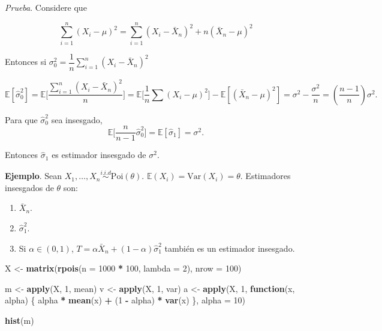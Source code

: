 \documentclass[
  12pt,
]{book}
\newenvironment{Shaded}{\begin{snugshade}}{\end{snugshade}}
\newcommand{\ControlFlowTok}[1]{\textcolor[rgb]{0.13,0.29,0.53}{\textbf{#1}}}
\newcommand{\DataTypeTok}[1]{\textcolor[rgb]{0.13,0.29,0.53}{#1}}
\newcommand{\DecValTok}[1]{\textcolor[rgb]{0.00,0.00,0.81}{#1}}
\newcommand{\KeywordTok}[1]{\textcolor[rgb]{0.13,0.29,0.53}{\textbf{#1}}}
\newcommand{\NormalTok}[1]{#1}
\newcommand{\OperatorTok}[1]{\textcolor[rgb]{0.81,0.36,0.00}{\textbf{#1}}}
\newcommand{\StringTok}[1]{\textcolor[rgb]{0.31,0.60,0.02}{#1}}
\begin{document}
\emph{Prueba}. Considere que

\begin{equation}
\sum_{i=1}^{n}\left(X_{i}-\mu\right)^{2}=\sum_{i=1}^{n}\left(X_{i}-\bar{X}_{n}\right)^{2}+n\left(\bar{X}_{n}-\mu\right)^{2}
\end{equation}

Entonces si \(\sigma_0 ^{2} = \dfrac 1n \sum_{i=1}^{n}\left(X_{i}-\bar{X}_{n}\right)^{2}\)

\[\mathbb E[\hat\sigma_0^2] = \mathbb E \bigg[ \dfrac {\sum_{i=1}^{n}\left(X_{i}-\bar{X}_{n}\right)^{2}}n \bigg] =  \mathbb E \bigg[ \dfrac 1n \sum(X_i-\mu)^2\bigg] - \mathbb E[(\bar X_n-\mu)^2] = \sigma^2-\dfrac{\sigma^2}n = \left(\dfrac{n-1}n\right)\sigma^2.\]

Para que \(\hat\sigma_0^2\) sea insesgado,
\[\mathbb E \bigg[\dfrac n{n-1}\hat\sigma_0^2\bigg] = \mathbb E[\hat\sigma_1] = \sigma^2.\]

Entonces \(\hat\sigma_1\) es estimador insesgado de \(\sigma^2\).

\textbf{Ejemplo}. Sean \(X_1,\dots,X_n \overset{i.i.d}{\sim}\text{Poi}(\theta)\).
\(\mathbb E(X_i) = \text{Var}(X_i) = \theta\). Estimadores insesgados de \(\theta\)
son:

\begin{enumerate}
\def\labelenumi{\arabic{enumi}.}
\item
  \(\bar X_n\).
\item
  \(\hat \sigma_1^2\).
\item
  Si \(\alpha \in (0,1)\), \(T = \alpha\bar X_n + (1-\alpha)\hat\sigma_1^2\)
  también es un estimador insesgado.
\end{enumerate}

\begin{Shaded}
\begin{Highlighting}[]
\NormalTok{X \textless{}{-}}\StringTok{ }\KeywordTok{matrix}\NormalTok{(}\KeywordTok{rpois}\NormalTok{(}\DataTypeTok{n =} \DecValTok{1000} \OperatorTok{*}\StringTok{ }\DecValTok{100}\NormalTok{, }\DataTypeTok{lambda =} \DecValTok{2}\NormalTok{), }\DataTypeTok{nrow =} \DecValTok{100}\NormalTok{)}

\NormalTok{m \textless{}{-}}\StringTok{ }\KeywordTok{apply}\NormalTok{(X, }\DecValTok{1}\NormalTok{, mean)}
\NormalTok{v \textless{}{-}}\StringTok{ }\KeywordTok{apply}\NormalTok{(X, }\DecValTok{1}\NormalTok{, var)}
\NormalTok{a \textless{}{-}}\StringTok{ }\KeywordTok{apply}\NormalTok{(X, }\DecValTok{1}\NormalTok{, }\ControlFlowTok{function}\NormalTok{(x, alpha) \{}
\NormalTok{  alpha }\OperatorTok{*}\StringTok{ }\KeywordTok{mean}\NormalTok{(x) }\OperatorTok{+}\StringTok{ }\NormalTok{(}\DecValTok{1} \OperatorTok{{-}}\StringTok{ }\NormalTok{alpha) }\OperatorTok{*}\StringTok{ }\KeywordTok{var}\NormalTok{(x)}
\NormalTok{\}, }\DataTypeTok{alpha =} \DecValTok{10}\NormalTok{)}

\KeywordTok{hist}\NormalTok{(m)}
\end{Highlighting}
\end{Shaded}
\end{document}

